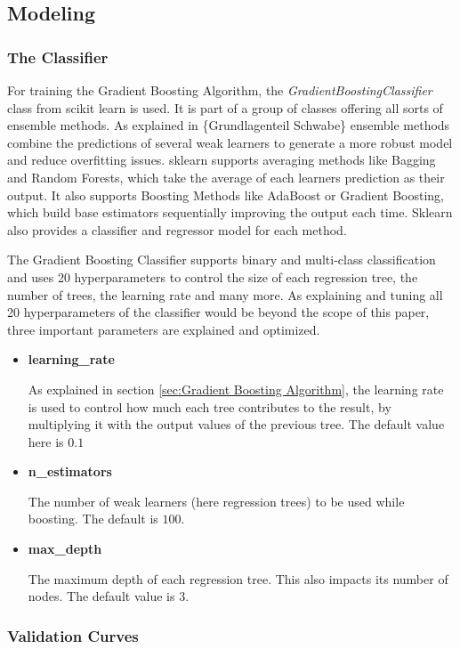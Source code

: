 \subsection{Modeling}

\subsubsection{The Classifier}

For training the Gradient Boosting Algorithm, the \emph{GradientBoostingClassifier} class from 
scikit learn is used. It is part of a group of classes offering all sorts of ensemble methods.
As explained in \{Grundlagenteil Schwabe\} ensemble methods combine the predictions of several
weak learners to generate a more robust model and reduce overfitting issues.
sklearn supports averaging methods like Bagging and Random Forests, which take the average of each learners prediction
as their output. It also supports Boosting Methods like AdaBoost or Gradient Boosting, which
build base estimators sequentially improving the output each time. Sklearn also provides 
a classifier and regressor model for each method.

The Gradient Boosting Classifier supports binary and multi-class classification and uses
20 hyperparameters to control the size of each regression tree, the number of trees,
the learning rate and many more.
As explaining and tuning all 20 hyperparameters of the classifier would be beyond the scope of this
paper, three important parameters are explained and optimized.

\begin{itemize}
    \item \textbf{learning\_rate}
    
    As explained in section \ref{sec:Gradient Boosting Algorithm}, the learning rate is used to control how
    much each tree contributes to the result, by multiplying it with the output values of the previous 
    tree. The default value here is $0.1$
    \item \textbf{n\_estimators}

    The number of weak learners (here regression trees) to be used while boosting. The default is $100$.
    \item \textbf{max\_depth}

    The maximum depth of each regression tree. This also impacts its number of nodes.
    The default value is $3$.
\end{itemize}

\subsubsection{Validation Curves}

